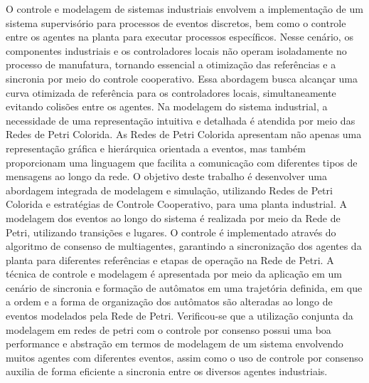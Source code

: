 O controle e modelagem de sistemas industriais envolvem a implementação de um sistema supervisório para processos de eventos discretos, bem como o controle entre os agentes na planta para executar processos específicos. Nesse cenário, os componentes industriais e os controladores locais não operam isoladamente no processo de manufatura, tornando essencial a otimização das referências e a sincronia por meio do controle cooperativo. Essa abordagem busca alcançar uma curva otimizada de referência para os controladores locais, simultaneamente evitando colisões entre os agentes. Na modelagem do sistema industrial, a necessidade de uma representação intuitiva e detalhada é atendida por meio das Redes de Petri Colorida. As Redes de Petri Colorida apresentam não apenas uma representação gráfica e hierárquica orientada a eventos, mas também proporcionam uma linguagem que facilita a comunicação com diferentes tipos de mensagens ao longo da rede.
O objetivo deste trabalho é desenvolver uma abordagem integrada de modelagem e simulação, utilizando Redes de Petri Colorida e estratégias de Controle Cooperativo, para uma planta industrial.
A modelagem dos eventos ao longo do sistema é realizada por meio da Rede de Petri, utilizando transições e lugares. O controle é implementado através do algoritmo de consenso de multiagentes, garantindo a sincronização dos agentes da planta para diferentes referências e etapas de operação na Rede de Petri.
A técnica de controle e modelagem é apresentada por meio da aplicação em um cenário de sincronia e formação de autômatos em uma trajetória definida, em que a ordem e a forma de organização dos autômatos são alteradas ao longo de eventos modelados pela Rede de Petri.
Verificou-se que a utilização conjunta da modelagem em redes de petri com o controle por consenso possui uma boa performance e abstração em termos de modelagem de um sistema envolvendo muitos agentes com diferentes eventos, assim como o uso de controle por consenso auxilia de forma eficiente a sincronia entre os diversos agentes industriais.

